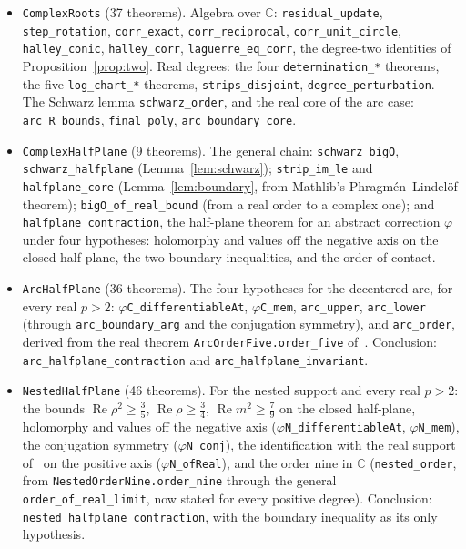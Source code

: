 \documentclass[10pt,a4paper]{article}
\theoremstyle{plain}
\theoremstyle{remark}
\numberwithin{equation}{section}
\newcommand{\C}{\mathbb{C}}\newcommand{\R}{\mathbb{R}}\newcommand{\Hp}{\mathbb{H}}
\DeclareMathOperator{\re}{Re}\DeclareMathOperator{\im}{Im}
\newcommand{\lean}[1]{\texttt{#1}}
\begin{document}
\begin{itemize}
\item \lean{ComplexRoots} (37 theorems). Algebra over $\C$: \lean{residual\_update},
  \lean{step\_rotation}, \lean{corr\_exact}, \lean{corr\_reciprocal}, \lean{corr\_unit\_circle},
  \lean{halley\_conic}, \lean{halley\_corr}, \lean{laguerre\_eq\_corr}, the degree-two identities of
  Proposition~\ref{prop:two}. Real degrees: the four \lean{determination\_*} theorems, the five
  \lean{log\_chart\_*} theorems, \lean{strips\_disjoint}, \lean{degree\_perturbation}. The Schwarz
  lemma \lean{schwarz\_order}, and the real core of the arc case: \lean{arc\_R\_bounds},
  \lean{final\_poly}, \lean{arc\_boundary\_core}.
\item \lean{ComplexHalfPlane} (9 theorems). The general chain: \lean{schwarz\_bigO},
  \lean{schwarz\_halfplane} (Lemma~\ref{lem:schwarz}); \lean{strip\_im\_le} and
  \lean{halfplane\_core} (Lemma~\ref{lem:boundary}, from Mathlib's Phragm\'en--Lindel\"of theorem);
  \lean{bigO\_of\_real\_bound} (from a real order to a complex one); and
  \lean{halfplane\_contraction}, the half-plane theorem for an abstract correction $\varphi$ under
  four hypotheses: holomorphy and values off the negative axis on the closed half-plane, the two
  boundary inequalities, and the order of contact.
\item \lean{ArcHalfPlane} (36 theorems). The four hypotheses for the decentered arc, for every real
  $p>2$: \lean{$\varphi$C\_differentiableAt}, \lean{$\varphi$C\_mem}, \lean{arc\_upper},
  \lean{arc\_lower} (through \lean{arc\_boundary\_arg} and the conjugation symmetry), and
  \lean{arc\_order}, derived from the real theorem \lean{ArcOrderFive.order\_five} of~\cite{v28}.
  Conclusion: \lean{arc\_halfplane\_contraction} and \lean{arc\_halfplane\_invariant}.
\item \lean{NestedHalfPlane} (46 theorems). For the nested support and every real $p>2$: the
  bounds $\re\rho^{2}\ge\frac35$, $\re\rho\ge\frac34$, $\re m^{2}\ge\frac79$ on the closed
  half-plane, holomorphy and values off the negative axis (\lean{$\varphi$N\_differentiableAt},
  \lean{$\varphi$N\_mem}), the conjugation symmetry (\lean{$\varphi$N\_conj}), the identification with
  the real support of~\cite{v28} on the positive axis (\lean{$\varphi$N\_ofReal}), and the order nine
  in $\C$ (\lean{nested\_order}, from \lean{NestedOrderNine.order\_nine} through the general
  \lean{order\_of\_real\_limit}, now stated for every positive degree). Conclusion:
  \lean{nested\_halfplane\_contraction}, with the boundary inequality as its only hypothesis.

\end{itemize}
\end{document}

